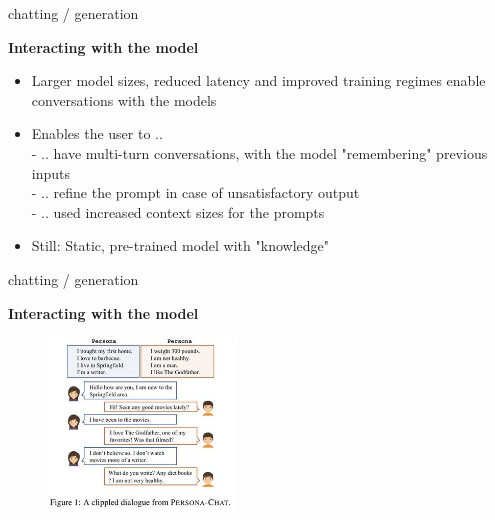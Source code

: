 \begin{vbframe}{chatting / generation}

\vfill
	
\textbf{Interacting with the model}

\begin{itemize}
	\item Larger model sizes, reduced latency and improved training regimes enable conversations with the models
	\item Enables the user to .. \\
	- .. have multi-turn conversations, with the model "remembering" previous inputs\\
	- .. refine the prompt in case of unsatisfactory output\\
	- .. used increased context sizes for the prompts
	\item Still: Static, pre-trained model with "knowledge" 
\end{itemize}

\vfill

\end{vbframe}


\begin{vbframe}{chatting / generation}

\vfill
	
\textbf{Interacting with the model}

\begin{figure}
	\centering
		\includegraphics[width = 5cm]{figure/persona-chat.jpg}\\ 
\end{figure}

\vfill

\end{vbframe}


